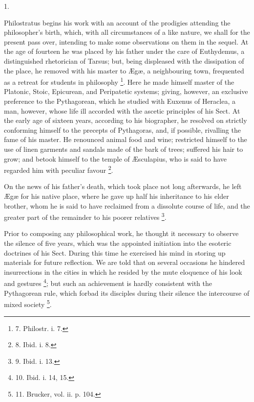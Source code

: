 1.

Philostratus begins his work
with an account of the prodigies attending the philosopher's birth,
which, with all circumstances of a like nature, we shall for the
present pass over, intending to make some observations on them in the
sequel. At the age of fourteen he was placed by his father under the
care of Euthydemus, a distinguished rhetorician of Tarsus; but, being
displeased with the dissipation of the place, he removed with
his master to Ægæ, a neighbouring town, frequented as a retreat for
students in philosophy \footnote{7.
Philostr. i. 7.}.
Here he made himself master of the Platonic, Stoic, Epicurean, and
Peripatetic systems; giving, however, an exclusive preference to the
Pythagorean, which he studied with Euxenus of Heraclea, a man,
however, whose life ill accorded with the ascetic principles of his
Sect. At the early age of sixteen years, according to his biographer,
he resolved on strictly conforming himself to the precepts of
Pythagoras, and, if possible, rivalling the fame of his master. He
renounced animal food and wine; restricted himself to the use of linen
garments and sandals made of the bark of trees; suffered his hair to
grow; and betook himself to the temple of Æsculapius, who is said to
have regarded him with peculiar favour \footnote{8.
Ibid. i. 8.}.

On the news of his father's
death, which took place not long afterwards, he left Ægæ for his
native place, where he gave up half his inheritance to his elder
brother, whom he is said to have reclaimed from a dissolute course of
life, and the greater part of the remainder to his poorer relatives \footnote{9.
Ibid. i. 13.}.

Prior to composing any
philosophical work, he thought it necessary to observe the silence of
five years, which was the appointed initiation into the esoteric
doctrines of his Sect. During this time he exercised his mind in
storing up materials for future reflection. We are told that on
several occasions he hindered insurrections in the cities in which he
resided by the mute eloquence of his look and gestures \footnote{10.
Ibid. i. 14, 15.}; but such an achievement is hardly consistent with the
Pythagorean rule, which forbad its disciples during their
silence the intercourse of mixed society \footnote{11.
Brucker, vol. ii. p. 104.}.

